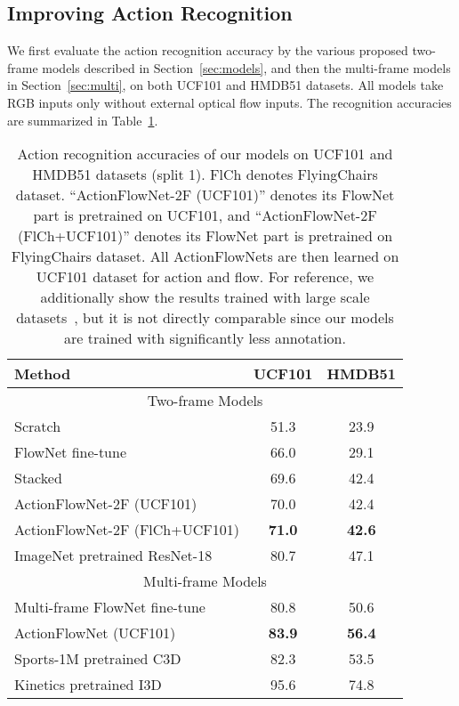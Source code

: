 \documentclass[10pt,twocolumn,letterpaper]{article}
\begin{document}
\subsection{Improving Action Recognition}
We first evaluate the action recognition accuracy by the various proposed two-frame models described in Section~\ref{sec:models}, and then the multi-frame models in Section~\ref{sec:multi}, on both UCF101 and HMDB51 datasets.
All models take RGB inputs only without external optical flow inputs.
The recognition accuracies are summarized in Table~\ref{tab:results}.

\begin{table}[h!]
\begin{center}
{\small
    \begin{tabular}{l|c|c}
    \hline
    Method & UCF101 & HMDB51\\
    \hline\hline
      \multicolumn{3}{c}{Two-frame Models} \\
      \hline
    Scratch & 51.3 & 23.9 \\
    FlowNet fine-tune & 66.0 & 29.1 \\
    \hline
    Stacked & 69.6 & 42.4  \\
    ActionFlowNet-2F (UCF101)         & 70.0 & 42.4 \\
    ActionFlowNet-2F (FlCh+UCF101)  & \textbf{71.0} & \textbf{42.6}  \\
    \hline
    ImageNet pretrained ResNet-18 & 80.7 & 47.1\\

    \hline \hline
      \multicolumn{3}{c}{Multi-frame Models} \\
      \hline
    Multi-frame FlowNet fine-tune  & 80.8 & 50.6 \\
    ActionFlowNet (UCF101) & \textbf{83.9} & \textbf{56.4} \\
      \hline
    Sports-1M pretrained C3D~\cite{tranBFTP15} & 82.3 & 53.5\\
    Kinetics pretrained I3D~\cite{carreira2017quo} & 95.6 & 74.8\\
    \hline
    \end{tabular}
}
\end{center}
  \vspace{-1em}
  \caption{Action recognition accuracies of our models on UCF101 and HMDB51 datasets (split 1). FlCh denotes FlyingChairs dataset. ``ActionFlowNet-2F (UCF101)'' denotes its FlowNet part is pretrained on UCF101, and ``ActionFlowNet-2F (FlCh+UCF101)'' denotes its FlowNet part is pretrained on FlyingChairs dataset. All ActionFlowNets are then learned on UCF101 dataset for action and flow. For reference, we additionally show the results trained with large scale datasets~\cite{tranbftp16,carreira2017quo}, but it is not directly comparable since our models are trained with significantly less annotation.}
\label{tab:results}
\end{table}
\end{document}
